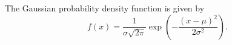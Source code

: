 The Gaussian probability density function is given by
\begin{equation}
  \label{eq:gaussian}
  f(x) = \frac{1}{\sigma\sqrt{2\pi}}
         \exp\!\left(-\frac{(x-\mu)^2}{2\sigma^2}\right).
\end{equation}
